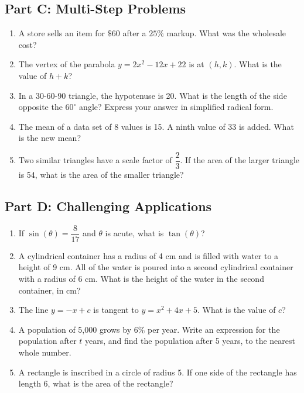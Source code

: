 \documentclass[14pt]{extarticle}
\begin{document}
\subsection*{Part C: Multi-Step Problems}
\begin{enumerate}
  \item A store sells an item for \(\$60\) after a \(25\%\) markup. What was the wholesale cost?
  \item The vertex of the parabola \(y = 2x^2 - 12x + 22\) is at \((h, k)\). What is the value of \(h + k\)?
  \item In a 30-60-90 triangle, the hypotenuse is 20. What is the length of the side opposite the \(60^\circ\) angle? Express your answer in simplified radical form.
  \item The mean of a data set of 8 values is 15. A ninth value of 33 is added. What is the new mean?
  \item Two similar triangles have a scale factor of \(\dfrac{2}{3}\). If the area of the larger triangle is 54, what is the area of the smaller triangle?
\end{enumerate}

\subsection*{Part D: Challenging Applications}
\begin{enumerate}
  \item If \(\sin(\theta) = \dfrac{8}{17}\) and \(\theta\) is acute, what is \(\tan(\theta)\)?
  \item A cylindrical container has a radius of 4 cm and is filled with water to a height of 9 cm. All of the water is poured into a second cylindrical container with a radius of 6 cm. What is the height of the water in the second container, in cm?
  \item The line \(y = -x + c\) is tangent to \(y = x^2 + 4x + 5\). What is the value of \(c\)?
  \item A population of 5{,}000 grows by \(6\%\) per year. Write an expression for the population after \(t\) years, and find the population after 5 years, to the nearest whole number.
  \item A rectangle is inscribed in a circle of radius 5. If one side of the rectangle has length 6, what is the area of the rectangle?
\end{enumerate}
\end{document}
